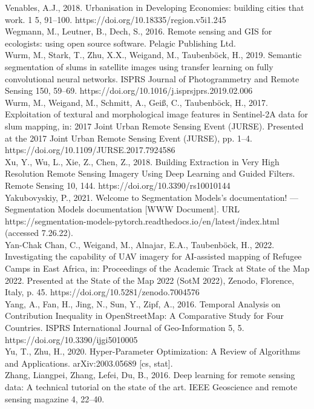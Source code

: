 \documentclass[11pt, a4paper, twoside]{report}
\begin{document}
Venables, A.J., 2018. Urbanisation in Developing Economies: building cities that work. 1 5, 91–100. https://doi.org/10.18335/region.v5i1.245\\
Wegmann, M., Leutner, B., Dech, S., 2016. Remote sensing and GIS for ecologists: using open source software. Pelagic Publishing Ltd.\\
Wurm, M., Stark, T., Zhu, X.X., Weigand, M., Taubenböck, H., 2019. Semantic segmentation of slums in satellite images using transfer learning on fully convolutional neural networks. ISPRS Journal of Photogrammetry and Remote Sensing 150, 59–69. https://doi.org/10.1016/j.isprsjprs.2019.02.006\\
Wurm, M., Weigand, M., Schmitt, A., Geiß, C., Taubenböck, H., 2017. Exploitation of textural and morphological image features in Sentinel-2A data for slum mapping, in: 2017 Joint Urban Remote Sensing Event (JURSE). Presented at the 2017 Joint Urban Remote Sensing Event (JURSE), pp. 1–4. https://doi.org/10.1109/JURSE.2017.7924586\\
Xu, Y., Wu, L., Xie, Z., Chen, Z., 2018. Building Extraction in Very High Resolution Remote Sensing Imagery Using Deep Learning and Guided Filters. Remote Sensing 10, 144. https://doi.org/10.3390/rs10010144\\
Yakubovyskiy, P., 2021. Welcome to Segmentation Models’s documentation! — Segmentation Models documentation [WWW Document]. URL https://segmentation-models-pytorch.readthedocs.io/en/latest/index.html (accessed 7.26.22).\\
Yan-Chak Chan, C., Weigand, M., Alnajar, E.A., Taubenböck, H., 2022. Investigating the capability of UAV imagery for AI-assisted mapping of Refugee Camps in East Africa, in: Proceedings of the Academic Track at State of the Map 2022. Presented at the State of the Map 2022 (SotM 2022), Zenodo, Florence, Italy, p. 45. https://doi.org/10.5281/zenodo.7004576\\
Yang, A., Fan, H., Jing, N., Sun, Y., Zipf, A., 2016. Temporal Analysis on Contribution Inequality in OpenStreetMap: A Comparative Study for Four Countries. ISPRS International Journal of Geo-Information 5, 5. https://doi.org/10.3390/ijgi5010005\\
Yu, T., Zhu, H., 2020. Hyper-Parameter Optimization: A Review of Algorithms and Applications. arXiv:2003.05689 [cs, stat].\\
Zhang, Liangpei, Zhang, Lefei, Du, B., 2016. Deep learning for remote sensing data: A technical tutorial on the state of the art. IEEE Geoscience and remote sensing magazine 4, 22–40.\\
\end{document}
